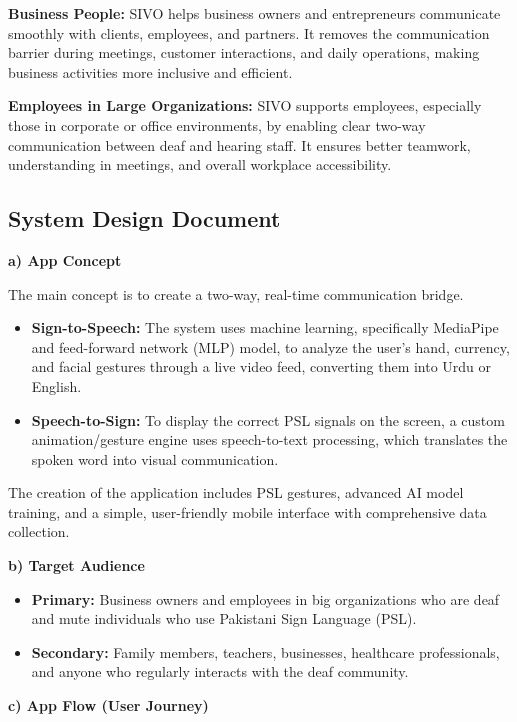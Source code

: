 \documentclass[12pt,a4paper,oneside]{report}
\begin{document}
\textbf{Business People:} SIVO helps business owners and entrepreneurs communicate smoothly with clients, employees, and partners. It removes the communication barrier during meetings, customer interactions, and daily operations, making business activities more inclusive and efficient.

\textbf{Employees in Large Organizations:} SIVO supports employees, especially those in corporate or office environments, by enabling clear two-way communication between deaf and hearing staff. It ensures better teamwork, understanding in meetings, and overall workplace accessibility.

\subsection{System Design Document}

\textbf{a) App Concept}

The main concept is to create a two-way, real-time communication bridge.

\begin{itemize}
  \item \textbf{Sign-to-Speech:} The system uses machine learning, specifically MediaPipe and feed-forward network (MLP) model, to analyze the user's hand, currency, and facial gestures through a live video feed, converting them into Urdu or English.
  \item \textbf{Speech-to-Sign:} To display the correct PSL signals on the screen, a custom animation/gesture engine uses speech-to-text processing, which translates the spoken word into visual communication.
\end{itemize}

The creation of the application includes PSL gestures, advanced AI model training, and a simple, user-friendly mobile interface with comprehensive data collection.

\textbf{b) Target Audience}

\begin{itemize}
  \item \textbf{Primary:} Business owners and employees in big organizations who are deaf and mute individuals who use Pakistani Sign Language (PSL).
  \item \textbf{Secondary:} Family members, teachers, businesses, healthcare professionals, and anyone who regularly interacts with the deaf community.
\end{itemize}

\textbf{c) App Flow (User Journey)}
\end{document}
